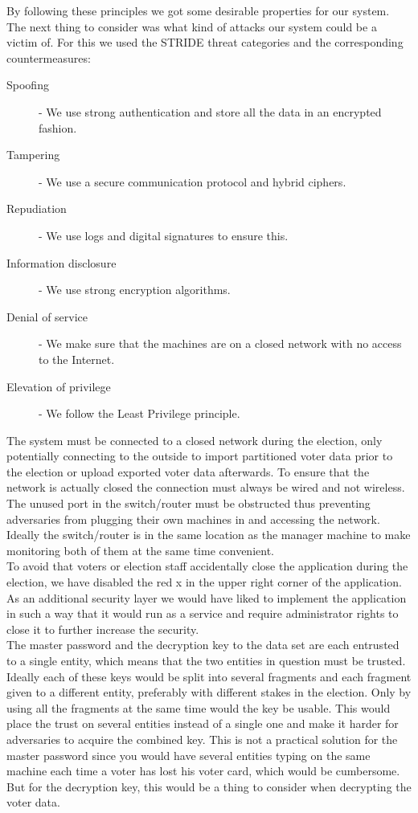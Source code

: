 \documentclass[a4paper]{report}
\begin{document}
By following these principles we got some desirable properties for our system. The next thing to consider was what kind of attacks our system could be a victim of. For this we used the STRIDE \cite{meier} threat categories and the corresponding countermeasures:

\begin{description}
\item [Spoofing]
- We use strong authentication and store all the data in an encrypted fashion.
\item [Tampering]
- We use a secure communication protocol and hybrid ciphers. 
\item [Repudiation]
- We use logs and digital signatures to ensure this.
\item [Information disclosure]
- We use strong encryption algorithms. 
\item [Denial of service]
- We make sure that the machines are on a closed network with no access to the Internet.
\item [Elevation of privilege]
- We follow the Least Privilege principle.
\end{description}

The system must be connected to a closed network during the election, only potentially connecting to the outside to import partitioned voter data prior to the election or upload exported voter data afterwards. To ensure that the network is actually closed the connection must always be wired and not wireless. The unused port in the switch/router must be obstructed thus preventing adversaries from plugging their own machines in and accessing the network. Ideally the switch/router is in the same location as the manager machine to make monitoring both of them at the same time convenient.\\

To avoid that voters or election staff accidentally close the application during the election, we have disabled the red x in the upper right corner of the application. As an additional security layer we would have liked to implement the application in such a way that it would run as a service and require administrator rights to close it to further increase the security. \\

The master password and the decryption key to the data set are each entrusted to a single entity, which means that the two entities in question must be trusted. Ideally each of these keys would be split into several fragments and each fragment given to a different entity, preferably with different stakes in the election. Only by using all the fragments at the same time would the key be usable. This would place the trust on several entities instead of a single one and make it harder for adversaries to acquire the combined key. This is not a practical solution for the master password since you would have several entities typing on the same machine each time a voter has lost his voter card, which would be cumbersome. But for the decryption key, this would be a thing to consider when decrypting the voter data. 
\end{document}
